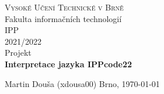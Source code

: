 \documentclass{article}
\begin{document}
\clearpage
\begin{titlepage}
	\begin{center}
		\textsc{\LARGE Vysoké Učení Technické v Brně}\\[0.5cm]
		{\LARGE Fakulta informačních technologií }\\[4.0cm]

		\textsc{\LARGE IPP}\\[0.5cm]
		\textsc{\LARGE 2021/2022}\\[3.5cm]

		{\LARGE Projekt}\\[0.5cm]
    {\LARGE \textbf{Interpretace jazyka IPPcode22}}\\
	\end{center}

	\vfill 

	\begin{flushleft} 
		\large
		Martin Douša (xdousa00)
		\hfill
		Brno, \today
	\end{flushleft}
\end{titlepage}
\thispagestyle{empty}

\newpage
\tableofcontents


\newpage



\end{document}
